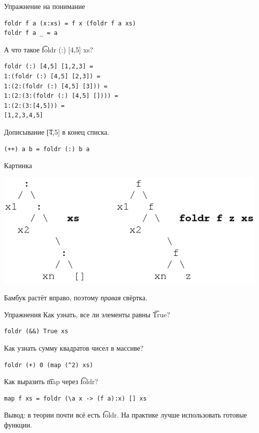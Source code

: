 \begin{frame}[fragile]{Упражнение на понимание}
\begin{verbatim}
foldr f a (x:xs) = f x (foldr f a xs)
foldr f a _ = a
\end{verbatim}

	А что такое \t{foldr (:) [4,5] xs}?
	\pause
\begin{verbatim}
foldr (:) [4,5] [1,2,3] =
1:(foldr (:) [4,5] [2,3]) =
1:(2:(foldr (:) [4,5] [3])) =
1:(2:(3:(foldr (:) [4,5] []))) =
1:(2:(3:[4,5])) =
[1,2,3,4,5]
\end{verbatim}
	Дописывание \t{[4,5]} в конец списка.

\begin{verbatim}
(++) a b = foldr (:) b a
\end{verbatim}
\end{frame}

\begin{frame}{Картинка}
	\begin{center}
		\includegraphics[scale=0.5]{foldr.png}
	\end{center}
	Бамбук растёт вправо, поэтому \textit{правая} свёртка.
\end{frame}

\begin{frame}[fragile]{Упражнения}
	Как узнать, все ли элементы равны \t{True}? \pause
\begin{verbatim}
foldr (&&) True xs
\end{verbatim}

	Как узнать сумму квадратов чисел в массиве? \pause
\begin{verbatim}
foldr (+) 0 (map (^2) xs)
\end{verbatim}

	Как выразить \t{map} через \t{foldr}? \pause
\begin{verbatim}
map f xs = foldr (\a x -> (f a):x) [] xs
\end{verbatim}
	Вывод: в теории почти всё есть \t{foldr}.
	На практике лучше использовать готовые функции.
\end{frame}
